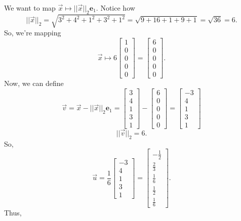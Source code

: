 \documentclass[letterpaper]{article}
\newcommand{\0}{\mathbf{0}}
\newcommand{\e}{\mathbf{e}}
\begin{document}
We want to map $\vec{x} \mapsto ||\vec{x}||_2 \e_1$. Notice how \[||\vec{x}||_2 = \sqrt{3^2 + 4^2 + 1^2 + 3^2 + 1^2} = \sqrt{9 + 16 + 1 + 9 + 1} = \sqrt{36} = 6.\] So, we're mapping \[\vec{x} \mapsto 6\begin{bmatrix}
    1 \\ 0 \\ 0 \\ 0 \\ 0
\end{bmatrix} = \begin{bmatrix}
    6 \\ 0 \\ 0 \\ 0 \\ 0
\end{bmatrix}.\] Now, we can define \[\vec{v} = \vec{x} - ||\vec{x}||_2 \e_1 = \begin{bmatrix}
    3 \\ 4 \\ 1 \\ 3 \\ 1
\end{bmatrix} - \begin{bmatrix}
    6 \\ 0 \\ 0 \\ 0 \\ 0
\end{bmatrix} = \begin{bmatrix}
    -3 \\ 4 \\ 1 \\ 3 \\ 1
\end{bmatrix}\] \[||\vec{v}||_2 = 6.\] So, 
\[\vec{u} = \frac{1}{6}\begin{bmatrix}
    -3 \\ 4 \\ 1 \\ 3 \\ 1
\end{bmatrix} = \begin{bmatrix}
    -\frac{1}{2} \\ \frac{2}{3} \\ \frac{1}{6} \\ \frac{1}{2} \\ \frac{1}{6}
\end{bmatrix}.\] Thus, 
\end{document}
